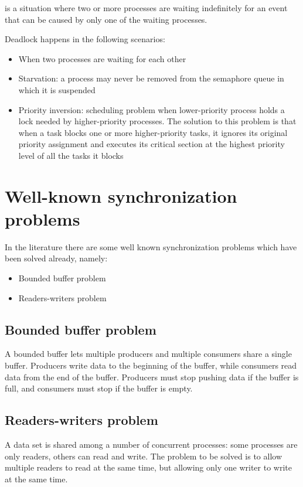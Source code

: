  is a situation where two or more processes are waiting indefinitely for an event that can be caused by only one of the waiting processes.

Deadlock happens in the following scenarios:
\begin{itemize}
    \item When two processes are waiting for each other
    \item Starvation: a process may never be removed from the semaphore queue in which it is suspended
    \item Priority inversion: scheduling problem when lower-priority process holds a lock needed by higher-priority processes. The solution to this problem is that when a task blocks one or more higher-priority tasks, it ignores its original priority assignment and executes its critical section at the highest priority level of all the tasks it blocks
\end{itemize}

\section{Well-known synchronization problems}
In the literature there are some well known synchronization problems which have been solved already, namely:
\begin{itemize}
    \item Bounded buffer problem
    \item Readers-writers problem
\end{itemize}

\subsection{Bounded buffer problem}
A bounded buffer lets multiple producers and multiple consumers share a single buffer. Producers write data to the beginning of the buffer, while consumers read data from the end of the buffer. Producers must stop pushing data if the buffer is full, and consumers must stop if the buffer is empty.


\subsection{Readers-writers problem}
A data set is shared among a number of concurrent processes: some processes are only readers, others can read and write. The problem to be solved is to allow multiple readers to read at the same time, but allowing only one writer to write at the same time.

